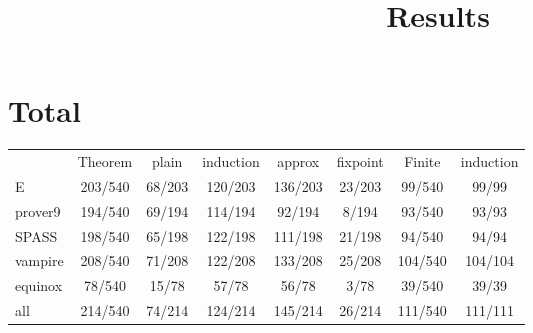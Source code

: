 \documentclass{article}
\begin{document}
\title{Results}
\maketitle

\section*{Total}
\begin{longtable}{l || c | c | c | c | c || c | c}
       & Theorem & plain & induction & approx & fixpoint & Finite & induction \\
E       & 203/540 & 68/203 & 120/203 & 136/203 & 23/203 & 99/540 & 99/99\\
prover9 & 194/540 & 69/194 & 114/194 & 92/194 & 8/194 & 93/540 & 93/93\\
SPASS   & 198/540 & 65/198 & 122/198 & 111/198 & 21/198 & 94/540 & 94/94\\
vampire & 208/540 & 71/208 & 122/208 & 133/208 & 25/208 & 104/540 & 104/104\\
equinox & 78/540 & 15/78 & 57/78 & 56/78 & 3/78 & 39/540 & 39/39\\
all     & 214/540 & 74/214 & 124/214 & 145/214 & 26/214 & 111/540 & 111/111\\

\end{longtable}
\end{document}
